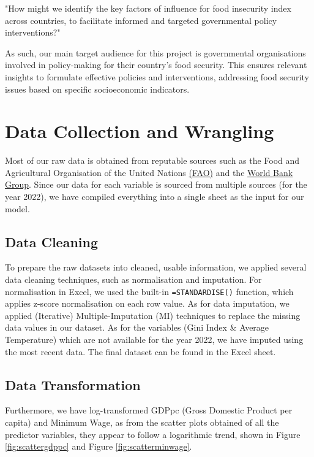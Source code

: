 \documentclass{article}
\begin{document}
\begin{formal}
    "How might we identify the key factors of influence for food insecurity index across countries, to facilitate informed and targeted governmental policy interventions?"
\end{formal}

\noindent As such, our main target audience for this project is governmental organisations involved in policy-making for their country's food security. This ensures relevant insights to formulate effective policies and interventions, addressing food security issues based on specific socioeconomic indicators.

\section{Data Collection and Wrangling}
Most of our raw data is obtained from reputable sources such as the Food and Agricultural Organisation of the United Nations \href{https://www.fao.org/home/en}{(FAO)} and the \href{https://data.worldbank.org}{World Bank Group}. Since our data for each variable is sourced from multiple sources (for the year 2022), we have compiled everything into a single sheet as the input for our model. 

\subsection{Data Cleaning}\label{NormalisationImputation}
To prepare the raw datasets into cleaned, usable information, we applied several data cleaning techniques, such as normalisation and imputation. For normalisation in Excel, we used the built-in \verb|=STANDARDISE()| function, which applies z-score normalisation on each row value. As for data imputation, we applied (Iterative) Multiple-Imputation (MI) techniques \cite{MeanImputation} \cite{scikit-learn} to replace the missing data values in our dataset. As for the variables (Gini Index \& Average Temperature) which are not available for the year 2022, we have imputed using the most recent data. The final dataset can be found in the Excel sheet.

\subsection{Data Transformation}
Furthermore, we have log-transformed GDPpc (Gross Domestic Product per capita) and Minimum Wage, as from the scatter plots obtained of all the predictor variables, they appear to follow a logarithmic trend, shown in Figure \ref{fig:scattergdppc} and Figure \ref{fig:scatterminwage}.
\end{document}
